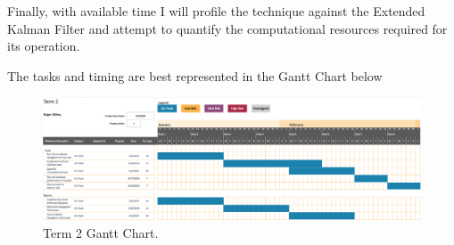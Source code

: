 \documentclass[]{../resources/final_report}
\begin{document}
Finally, with available time I will profile the technique against the Extended Kalman Filter and
attempt to quantify the computational resources required for its operation.

The tasks and timing are best represented in the Gantt Chart below
\begin{figure}[h]
  \centering
  \includegraphics[width=\textwidth]{Term2GanttChart.png}  
  \caption{Term 2 Gantt Chart.}
  \label{}
\end{figure}


\newpage


\nocite{*}

\label{endpage}
\end{document}
